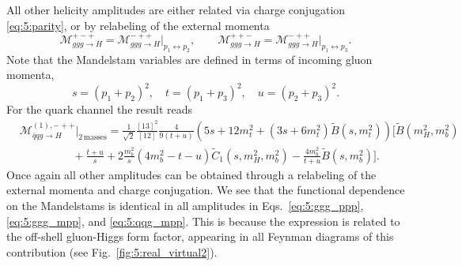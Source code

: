 All other helicity amplitudes are either related via charge conjugation \eqref{eq:5:parity}, or by relabeling of the external momenta
\begin{equation}
\mathcal{M}_{ggg \rightarrow H}^{+-+} = \mathcal{M}_{ggg \rightarrow H}^{-++} \bigg \vert_{p_1 \leftrightarrow p_2}, \qquad \mathcal{M}_{ggg \rightarrow H}^{++-} = \mathcal{M}_{ggg \rightarrow H}^{-++} \bigg \vert_{p_1 \leftrightarrow p_3}.
\label{eq:5:momentum_exchange}
\end{equation}
Note that the Mandelstam variables are defined in terms of incoming gluon momenta, \ie\
\begin{equation}
s = (p_1 + p_2)^2, \quad t = (p_1 + p_3)^2, \quad u = (p_2 + p_3)^2.
\end{equation}
For the quark channel the result reads
\begin{equation}
\begin{split}
&\mathcal{M}_{\bar{q}q g \rightarrow H}^{(1),-++} \bigg \vert_{2\, \text{masses}} =  \frac{1}{\sqrt{2}} \frac{[13]^2}{[12]}  \frac{4 }{9 (t + u)} \left(5 s + 12 m_t^2 + (3 s + 6 m_t^2) \tilde{B}\!(s, m_t^2) \right)\bigg [\tilde{B}\!(m_H^2, m_b^2) \\
& \hspace{2cm}  + \frac{t + u}{s} + 2 \frac{m_b^2}{s} \left(4m_b^2 - t - u  \right) \tilde{C}_1\!(s, m_H^2, m_b^2) - \frac{4 m_b^2}{t + u}\tilde{B}\!(s, m_b^2) \bigg ].
\label{eq:5:qqg_mpp}
\end{split}
\end{equation}
Once again all other amplitudes can be obtained through a relabeling of the external momenta and charge conjugation. We see that the functional dependence on the Mandelstams is identical in all amplitudes in Eqs.~\eqref{eq:5:ggg_ppp}, \eqref{eq:5:ggg_mpp}, and \eqref{eq:5:qqg_mpp}. This is because the expression is related to the off-shell gluon-Higgs form factor, appearing in all Feynman diagrams of this contribution (see Fig.~\ref{fig:5:real_virtual2}).

